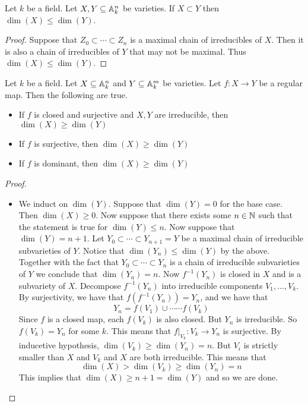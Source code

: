\documentclass[a4paper]{article}
\begin{document}
\begin{lmm}{}{} Let $k$ be a field. Let $X,Y\subseteq\mathbb{A}_k^n$ be varieties. If $X\subset Y$ then $\dim(X)\leq\dim(Y)$. \tcbline
\begin{proof}
Suppose that $Z_0\subset\cdots\subset Z_n$ is a maximal chain of irreducibles of $X$. Then it is also a chain of irreducibles of $Y$ that may not be maximal. Thus $\dim(X)\leq\dim(Y)$. 
\end{proof}
\end{lmm}

\begin{prp}{}{} Let $k$ be a field. Let $X\subseteq\mathbb{A}_k^n$ and $Y\subseteq\mathbb{A}_k^m$ be varieties. Let $f:X\to Y$ be a regular map. Then the following are true. 
\begin{itemize}
\item If $f$ is closed and surjective and $X,Y$ are irreducible, then $\dim(X)\geq\dim(Y)$
\item If $f$ is surjective, then $\dim(X)\geq\dim(Y)$
\item If $f$ is dominant, then $\dim(X)\geq\dim(Y)$
\end{itemize} \tcbline
\begin{proof}~\\
\begin{itemize}
\item We induct on $\dim(Y)$. Suppose that $\dim(Y)=0$ for the base case. Then $\dim(X)\geq 0$. Now suppose that there exists some $n\in\mathbb{N}$ such that the statement is true for $\dim(Y)\leq n$. Now suppose that $\dim(Y)=n+1$. Let $Y_0\subset\cdots\subset Y_{n+1}=Y$ be a maximal chain of irreducible subvarieties of $Y$. Notice that $\dim(Y_n)\leq\dim(Y)$ by the above. Together with the fact that $Y_0\subset\cdots\subset Y_n$ is a chain of irreducible subvarieties of $Y$ we conclude that $\dim(Y_n)=n$. Now $f^{-1}(Y_n)$ is closed in $X$ and is a subvariety of $X$. Decompose $f^{-1}(Y_n)$ into irreducible components $V_1,\dots,V_k$. By surjectivity, we have that $f(f^{-1}(Y_n))=Y_n$, and we have that $$Y_n=f(V_1)\cup\cdots\cdots f(V_k)$$ Since $f$ is a closed map, each $f(V_k)$ is also closed. But $Y_n$ is irreducible. So $f(V_k)=Y_n$ for some $k$. This means that $f|_{V_k}:V_k\to Y_n$ is surjective. By inducetive hypothesis, $\dim(V_k)\geq\dim(Y_n)=n$. But $V_i$ is strictly smaller than $X$ and $V_k$ and $X$ are both irreducible. This means that $$\dim(X)>\dim(V_k)\geq\dim(Y_n)=n$$ This implies that $\dim(X)\geq n+1=\dim(Y)$ and so we are done. 
\end{itemize}
\end{proof}
\end{prp}
\end{document}
